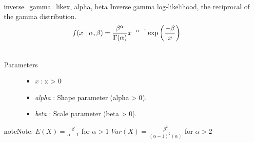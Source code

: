 \hypertarget{pymc.distributions.inverse_gamma_like}{}\begin{funcdesc}{inverse\_gamma\_like}{x, alpha, beta}
Inverse gamma log-likelihood, the reciprocal of the gamma distribution.
\begin{gather}
\begin{split}f(x \mid \alpha, \beta) = \frac{\beta^{\alpha}}{\Gamma(\alpha)} x^{-\alpha - 1} \exp\left(\frac{-\beta}{x}\right)\end{split}\notag\\\begin{split}\end{split}\notag
\end{gather}\begin{description}
\item[Parameters] \leavevmode\begin{itemize}
\item {} 
\emph{x} : x \textgreater{} 0

\item {} 
\emph{alpha} : Shape parameter (alpha \textgreater{} 0).

\item {} 
\emph{beta} : Scale parameter (beta \textgreater{} 0).

\end{itemize}

\end{description}

\begin{notice}{note}{Note:}
$E(X)=\frac{\beta}{\alpha-1}$  for $\alpha > 1$
$Var(X)=\frac{\beta^2}{(\alpha-1)^2(\alpha)}$  for $\alpha > 2$
\end{notice}
\end{funcdesc}

